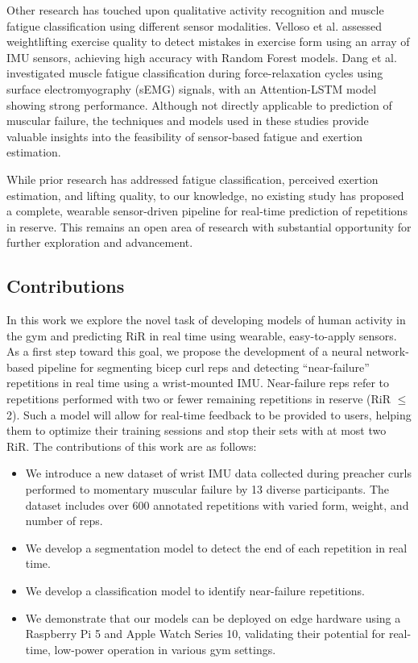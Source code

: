 \documentclass[conference]{IEEEtran}
\begin{document}
Other research has touched upon qualitative activity recognition and muscle fatigue classification using different sensor modalities. Velloso et al. \cite{velloso2013qualitative} assessed weightlifting exercise quality to detect mistakes in exercise form using an array of IMU sensors, achieving high accuracy with Random Forest models. Dang et al. \cite{dang2023fatigue} investigated muscle fatigue classification during force-relaxation cycles using surface electromyography (sEMG) signals, with an Attention-LSTM model showing strong performance. Although not directly applicable to prediction of muscular failure, the techniques and models used in these studies provide valuable insights into the feasibility of sensor-based fatigue and exertion estimation.

While prior research has addressed fatigue classification, perceived exertion estimation, and lifting quality, to our knowledge, no existing study has proposed a complete, wearable sensor-driven pipeline for real-time prediction of repetitions in reserve. This remains an open area of research with substantial opportunity for further exploration and advancement.

\subsection{Contributions}
In this work we explore the novel task of developing models of human activity in the gym and predicting RiR in real time using wearable, easy-to-apply sensors. As a first step toward this goal, we propose the development of a neural network-based pipeline for segmenting bicep curl reps and detecting ``near-failure'' repetitions in real time using a wrist-mounted IMU. Near-failure reps refer to repetitions performed with two or fewer remaining repetitions in reserve (RiR $\leq$ 2). Such a model will allow for real-time feedback to be provided to users, helping them to optimize their training sessions and stop their sets with at most two RiR. The contributions of this work are as follows:

\begin{itemize}
    \item We introduce a new dataset of wrist IMU data collected during preacher curls performed to momentary muscular failure by 13 diverse participants. The dataset includes over 600 annotated repetitions with varied form, weight, and number of reps.
    \item We develop a segmentation model to detect the end of each repetition in real time.
    \item We develop a classification model to identify near-failure repetitions.
    \item We demonstrate that our models can be deployed on edge hardware using a Raspberry Pi 5 and Apple Watch Series 10, validating their potential for real-time, low-power operation in various gym settings.
\end{itemize}
\end{document}
